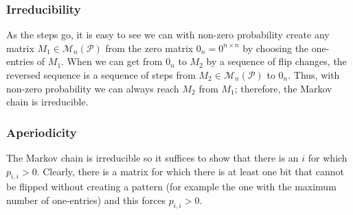 \subsubsection{Irreducibility}
As the steps go, it is easy to see we can with non-zero probability create any matrix $M_1\in\mathcal{M}_n(\mathcal{P})$ from the zero matrix $0_n=0^{n\times n}$ by choosing the one-entries of $M_1$. When we can get from $0_n$ to $M_2$ by a sequence of flip changes, the reversed sequence is a sequence of steps from $M_2\in\mathcal{M}_n(\mathcal{P})$ to $0_n$. Thus, with non-zero probability we can always reach $M_2$ from $M_1$; therefore, the Markov chain is irreducible.
\subsubsection{Aperiodicity}
The Markov chain is irreducible so it suffices to show that there is an $i$ for which $p_{i,i}>0$. Clearly, there is a matrix for which there is at least one bit that cannot be flipped without creating a pattern (for example the one with the maximum number of one-entries) and this forces $p_{i,i}>0$.